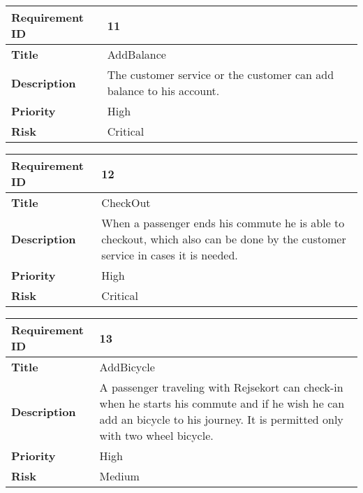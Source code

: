 \begin{center}
	\def\arraystretch{1.5}%
    \begin{tabular}{ | p{5cm} | p{5cm} |}
    \hline
    	\textbf{Requirement ID} & 11 \\ \hline
		\textbf{Title} & AddBalance\\ \hline
		\textbf{Description} & The customer service or the customer can add balance to his account.\\ \hline
		\textbf{Priority} & High\\ \hline
		\textbf{Risk} & Critical\\
      \hline
    \end{tabular}
\end{center}

\begin{center}
	\def\arraystretch{1.5}%
    \begin{tabular}{ | p{5cm} | p{5cm} |}
    \hline
    	\textbf{Requirement ID} & 12 \\ \hline
		\textbf{Title} & CheckOut\\ \hline
		\textbf{Description} & When a passenger ends his commute he is able to checkout, which also can be done by the customer service in cases it is needed.\\ \hline
		\textbf{Priority} & High\\ \hline
		\textbf{Risk} & Critical\\
      \hline
    \end{tabular}
\end{center}

\begin{center}
	\def\arraystretch{1.5}%
    \begin{tabular}{ | p{5cm} | p{5cm} |}
    \hline
    	\textbf{Requirement ID} & 13 \\ \hline
		\textbf{Title} & AddBicycle\\ \hline
		\textbf{Description} & A passenger traveling with Rejsekort can check-in when he starts his commute and if he wish he can add an bicycle to his journey. It is permitted only with two wheel bicycle.\\ \hline
		\textbf{Priority} & High\\ \hline
		\textbf{Risk} & Medium\\
      \hline
    \end{tabular}
\end{center}

